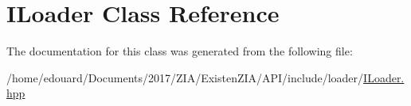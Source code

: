 \hypertarget{classILoader}{}\section{I\+Loader Class Reference}
\label{classILoader}


The documentation for this class was generated from the following file\+:\begin{DoxyCompactItemize}
\item 
/home/edouard/\+Documents/2017/\+Z\+I\+A/\+Existen\+Z\+I\+A/\+A\+P\+I/include/loader/\mbox{\hyperlink{ILoader_8hpp}{I\+Loader.\+hpp}}\end{DoxyCompactItemize}

